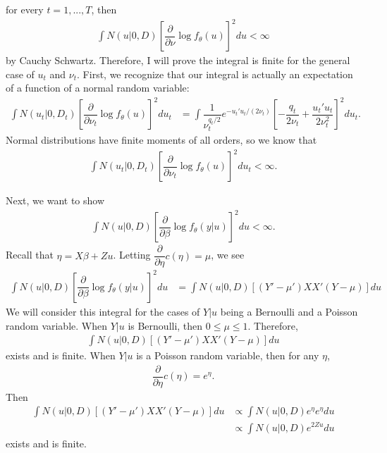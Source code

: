 \documentclass{article}
\begin{document}
for every $t=1,...,T$, then
\begin{align}
\int N(u|0,D) \left[  \dfrac{\partial}{\partial \nu} \log f_\theta(u)  \right]^2 du < \infty
\end{align}
by Cauchy Schwartz.  Therefore, I will prove the integral is finite for the general case of $u_t$ and $\nu_t$. First, we recognize that our integral is actually an expectation of a function of a normal random variable:
\begin{align}
\int N(u_t|0,D_t) \left[  \dfrac{\partial}{\partial \nu_t} \log f_\theta(u)  \right]^2 du_t &=
\int \dfrac{1}{\nu_t^{q_t/2}} e^{-u_t'u_t/(2 \nu_t)} \left[ -\dfrac{q_t}{2 \nu_t} + \dfrac{u_t'u_t}{2 \nu_t^2}  \right]^2 du_t .
\end{align}
Normal distributions have finite moments of all orders, so we know that\begin{align}
\int N(u_t|0,D_t) \left[  \dfrac{\partial}{\partial \nu_t} \log f_\theta(u)  \right]^2 du_t < \infty.
\end{align}




Next, we want to show 
\begin{align}
\int N(u|0,D) \left[\dfrac{\partial}{\partial \beta} \log f_\theta(y|u)   \right]^2 du < \infty.
\end{align}
 Recall that $\eta=X \beta +Z u$. Letting $\dfrac{\partial}{\partial \eta} c(\eta)=\mu$, we see 
\begin{align}
\int N(u|0,D) \left[\dfrac{\partial}{\partial \beta} \log f_\theta(y|u)   \right]^2 du &= \int N(u|0,D) \left[ (Y'- \mu') X X'(Y- \mu)   \right] du
\end{align}
We will consider this integral for the cases of $Y|u$ being a Bernoulli and a Poisson random variable. When $Y|u$ is Bernoulli, then $0 \leq \mu \leq 1.$ Therefore,
\begin{align}
\int N(u|0,D) \left[ (Y'- \mu') X X'(Y- \mu)   \right] du
\end{align}
exists and is finite.
When $Y|u$ is a Poisson random variable, then for any  $\eta$, 
\begin{align}
\dfrac{\partial}{\partial \eta} c(\eta) = e^\eta.
\end{align}
Then
\begin{align}
\int N(u|0,D) \left[ (Y'- \mu') X X'(Y- \mu)   \right] du &\propto \int N(u|0,D)  e^{\eta} e^{\eta}    du \\
&\propto \int N(u|0,D) e^{2Zu} du 
\end{align}
exists and is finite.
\end{document}
